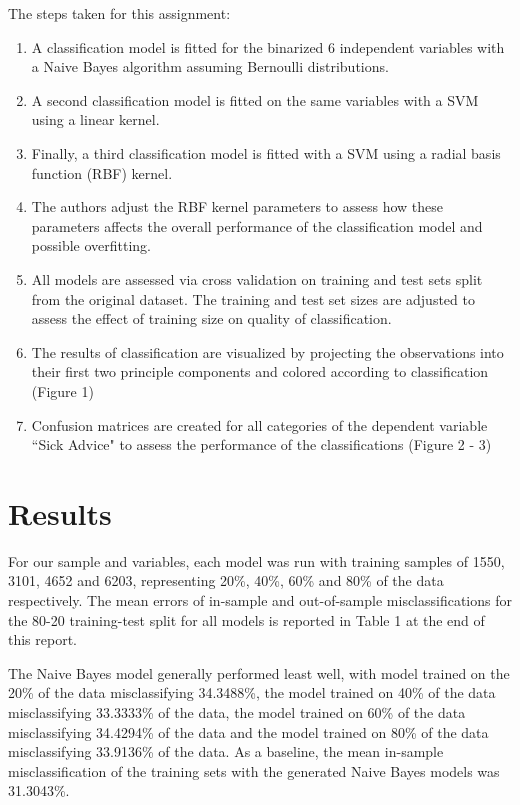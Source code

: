 \documentclass[10pt,twocolumn]{article}
\begin{document}
The steps taken for this assignment:

\begin{enumerate}
\item A classification model is fitted for the binarized 6 independent variables with
a Naive Bayes algorithm assuming Bernoulli distributions.
\item A second classification model is fitted on the same variables with
a SVM using a linear kernel.
\item Finally, a third classification model is fitted with a SVM using a radial basis
function (RBF) kernel.
\item The authors adjust the RBF kernel parameters to assess how these parameters
affects the overall performance of the classification model and possible overfitting.
\item All models are assessed via cross validation on training and test sets split
from the original dataset. The training and test set sizes are adjusted to assess the effect of training size on quality
of classification.
\item The results of classification are visualized by projecting the observations
into their first two principle components and colored according to classification (Figure 1)
\item Confusion matrices are created for all categories of the dependent variable
``Sick Advice" to assess the performance of the classifications (Figure 2 - 3)
\end{enumerate}

\section{Results}

For our sample and variables, each model was run with training samples of 1550,
3101, 4652 and 6203, representing 20\%, 40\%, 60\% and 80\% of the data respectively.
The mean errors of in-sample and out-of-sample misclassifications for the 80-20 training-test
split for all models is reported in Table 1 at the end of this report.

The Naive Bayes model generally performed least well, with model trained on the
20\% of the data misclassifying 34.3488\%, the model trained on 40\% of the data
misclassifying 33.3333\% of the data, the model trained on 60\% of the data
misclassifying 34.4294\% of the data and the model trained on 80\% of the data
misclassifying 33.9136\% of the data. As a baseline, the mean
in-sample misclassification of the training sets with the generated Naive Bayes models
 was 31.3043\%.
\end{document}
